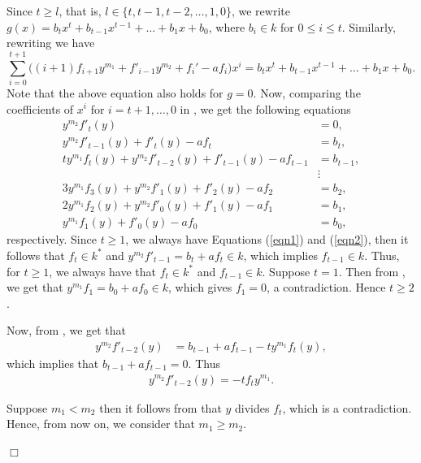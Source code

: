 \documentclass[12pt,reqno]{amsart}
\renewcommand{\leq}{\leqslant}
\renewcommand{\geq}{\geqslant}
\numberwithin{thm}{section}
\theoremstyle{definition}
\numberwithin{equation}{thm}
\renewenvironment{proof}{\par\noindent {\em Proof:}}{\hfill$\Box$\medskip}
\theoremstyle{plain}
\begin{document}
\begin{proof}
	Since $t\geq l$, that is, $l\in \{t,t-1,t-2,\dots,1,0\}$, we rewrite $g(x)=b_{t}x^{t}+b_{t-1}x^{t-1}+\dots+b_1x+b_0$, where $b_i\in k $ for $0\leq i\leq t$. Similarly, rewriting  we have
	\begin{equation}\label{maineqn2}
		\sum_{i=0}^{t+1}\bigg((i+1)f_{i+1}y^{m_1}+f'_{i-1}y^{m_2}+f_i'-af_i\bigg)x^i=b_tx^t+b_{t-1}x^{t-1}+\dots+b_1x+b_0.
	\end{equation}
	Note that the above equation also holds for $g=0$.    
	Now, comparing the coefficients of $x^i$ for $i =t+1,\ldots ,0$ in , we get the following equations
	\begin{align}
		\label{eqn1}	y^{m_2}f'_t(y)&=0,\\
		\label{eqn2}	y^{m_2}f'_{t-1}(y)+f'_t(y)-af_t&=b_t,\\
		\label{eqn3}  ty^{m_1}f_t(y)+y^{m_2}f'_{t-2}(y)+f'_{t-1}(y)-af_{t-1}&=b_{t-1},\\
		\hspace{3cm} & \vdots  \nonumber
		\\
		\label{eqn4} 3y^{m_1}f_3(y)+y^{m_2}f'_{1}(y)+f'_{2}(y)-af_2&=b_2,\\
		\label{eqn5} 2y^{m_1}f_2(y)+y^{m_2}f'_{0}(y)+f'_{1}(y)-af_1&=b_1,\\
		\label{eqn6} y^{m_1}f_1(y)+f'_{0}(y)-af_0&=b_0,
	\end{align} respectively. 
	Since $t\geq 1$, we always have Equations (\ref{eqn1}) and (\ref{eqn2}), then it follows that $f_t\in k^{\ast}$ and $y^{m_2}f'_{t-1}=b_t+af_t\in k$, which implies $f_{t-1}\in k$. Thus, for $t\geq 1$, we always have that $f_t\in k^{\ast}$ and $f_{t-1}\in k$.
	Suppose $t=1$. Then from , we get that $y^{m_1}f_1=b_0+af_0\in k$, which gives $f_1=0$, a contradiction. Hence $t\geq 2$. 

   
	Now, from , we get that
	\begin{align*}
		y^{m_2}f'_{t-2}(y)&=b_{t-1}+af_{t-1}-ty^{m_1}f_t(y),
	\end{align*}which implies that $b_{t-1}+af_{t-1}=0$. Thus
	\begin{align}\label{Eqn1}
		y^{m_2}f'_{t-2}(y)=-tf_ty^{m_1}.
	\end{align}
	
	Suppose $m_1<m_2$ then it follows from  that $y$ divides $f_{t}$, which is a contradiction. Hence, from now on, we consider that $m_1\geq m_2$.
	

\end{proof}
\end{document}
